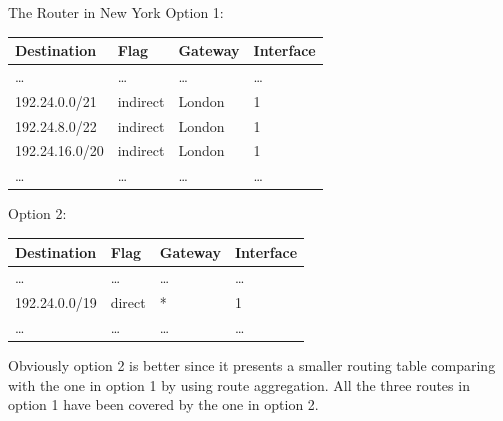 \begin{frame}
  \begin{iblock}{The Router in New York}
    Option 1:
    \begin{center}{\ttfamily
        \begin{tabular}{llll}
          \toprule
          Destination&Flag&Gateway&Interface\\\midrule
          \ldots&\ldots&\ldots&\ldots\\
          192.24.0.0/21&indirect&London&1\\
          192.24.8.0/22&indirect&London&1\\
          192.24.16.0/20&indirect&London&1\\
          \ldots&\ldots&\ldots&\ldots\\\bottomrule
        \end{tabular}}
    \end{center}
    Option 2:
    \begin{center}{\ttfamily
        \begin{tabular}{llll}
          \toprule
          Destination&Flag&Gateway&Interface\\\midrule
          \ldots&\ldots&\ldots&\ldots\\
          192.24.0.0/19&direct&*&1\\
          \ldots&\ldots&\ldots&\ldots\\\bottomrule
        \end{tabular}}
    \end{center}
  \end{iblock}
\end{frame}

Obviously option 2 is better since it presents a smaller routing table comparing with the
one in option 1 by using route aggregation. All the three routes in option 1 have been
covered by the one in option 2.

